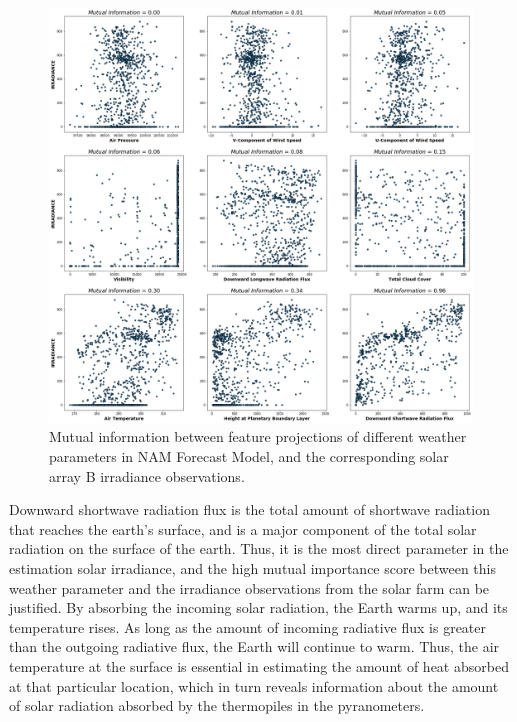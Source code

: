 \begin{figure}[htbp]
    \begin{center}
    	\includegraphics[width=\textwidth]{chapter3/fig_mi_ugabpoa1irr.png}
    	\caption[Mutual information between different NAM weather parameter projections and corresponding solar array B irradiance observations.]{Mutual information between feature projections of different weather parameters in NAM Forecast Model, and the corresponding solar array B irradiance observations.}
    	\label{fig:fig_mi_forecast_target_hr1}
    \end{center}
\end{figure}

\par Downward shortwave radiation flux is the total amount of shortwave radiation that reaches the earth's surface, and is a major component of the total solar radiation on the surface of the earth. Thus, it is the most direct parameter in the estimation solar irradiance, and the high mutual importance score between this weather parameter and the irradiance observations from the solar farm can be justified. By absorbing the incoming solar radiation, the Earth warms up, and its temperature rises. As long as the amount of incoming radiative flux is greater than the outgoing radiative flux, the Earth will continue to warm. Thus, the air temperature at the surface is essential in estimating the amount of heat absorbed at that particular location, which in turn reveals information about the amount of solar radiation absorbed by the thermopiles in the pyranometers. 

